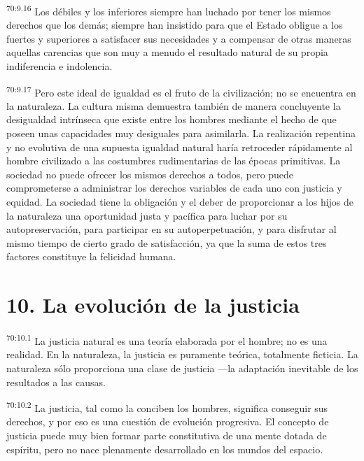 \par
\textsuperscript{70:9.16} Los débiles y los inferiores siempre han luchado por tener los mismos derechos que los demás; siempre han insistido para que el Estado obligue a los fuertes y superiores a satisfacer sus necesidades y a compensar de otras maneras aquellas carencias que son muy a menudo el resultado natural de su propia indiferencia e indolencia.

\par
\textsuperscript{70:9.17} Pero este ideal de igualdad es el fruto de la civilización; no se encuentra en la naturaleza. La cultura misma demuestra también de manera concluyente la desigualdad intrínseca que existe entre los hombres mediante el hecho de que poseen unas capacidades muy desiguales para asimilarla. La realización repentina y no evolutiva de una supuesta igualdad natural haría retroceder rápidamente al hombre civilizado a las costumbres rudimentarias de las épocas primitivas. La sociedad no puede ofrecer los mismos derechos a todos, pero puede comprometerse a administrar los derechos variables de cada uno con justicia y equidad. La sociedad tiene la obligación y el deber de proporcionar a los hijos de la naturaleza una oportunidad justa y pacífica para luchar por su autopreservación, para participar en su autoperpetuación, y para disfrutar al mismo tiempo de cierto grado de satisfacción, ya que la suma de estos tres factores constituye la felicidad humana.

\section*{10. La evolución de la justicia}
\par
\textsuperscript{70:10.1} La justicia natural es una teoría elaborada por el hombre; no es una realidad. En la naturaleza, la justicia es puramente teórica, totalmente ficticia. La naturaleza sólo proporciona una clase de justicia ---la adaptación inevitable de los resultados a las causas.

\par
\textsuperscript{70:10.2} La justicia, tal como la conciben los hombres, significa conseguir sus derechos, y por eso es una cuestión de evolución progresiva. El concepto de justicia puede muy bien formar parte constitutiva de una mente dotada de espíritu, pero no nace plenamente desarrollado en los mundos del espacio.

